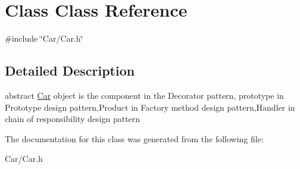 \hypertarget{classClass}{}\section{Class Class Reference}
\label{classClass}


{\ttfamily \#include \char`\"{}Car/\+Car.\+h\char`\"{}}



\subsection{Detailed Description}
abstract \hyperlink{classCar}{Car} object is the component in the Decorator pattern, prototype in Prototype design pattern,Product in Factory method design pattern,Handler in chain of responsibility design pattern 

The documentation for this class was generated from the following file\+:\begin{DoxyCompactItemize}
\item 
Car/Car.\+h\end{DoxyCompactItemize}
